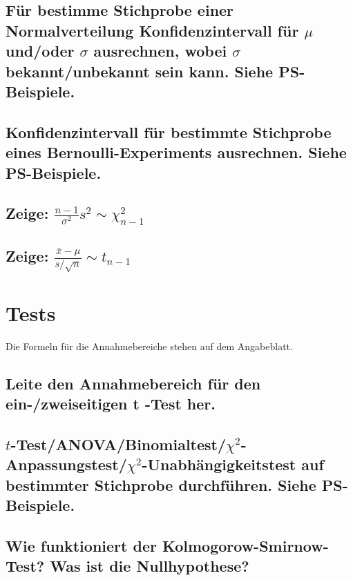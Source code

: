 \documentclass[a4paper,10pt]{article}
\begin{document}
\subsection{Für bestimme Stichprobe einer Normalverteilung Konfidenzintervall für $\mu$ und/oder $\sigma$ ausrechnen, wobei $\sigma$ bekannt/unbekannt sein kann. Siehe PS-Beispiele.}

\subsection{Konfidenzintervall für bestimmte Stichprobe eines Bernoulli-Experiments ausrechnen. Siehe PS-Beispiele.}

\subsection{Zeige: $\frac{n-1}{\sigma^2} s^2 \sim \chi^{2}_{n-1}$}

\subsection{Zeige: $\frac{\bar{x} - \mu}{s/\sqrt{n}} \sim t_{n-1}$}

\newpage
\section{Tests}
Die Formeln für die Annahmebereiche stehen auf dem Angabeblatt.

\subsection{Leite den Annahmebereich für den ein-/zweiseitigen t -Test her.}

\subsection{$t$-Test/ANOVA/Binomialtest/$\chi^2$-Anpassungstest/$\chi^2$-Unabhängigkeitstest auf bestimmter Stichprobe durchführen.
Siehe PS-Beispiele.}

\subsection{Wie funktioniert der Kolmogorow-Smirnow-Test? Was ist die Nullhypothese?}

\newpage
\end{document}
